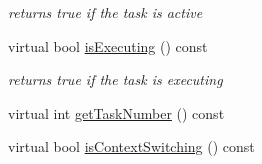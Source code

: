 \begin{DoxyCompactItemize}
\begin{DoxyCompactList}\small\item\em returns true if the task is active \end{DoxyCompactList}\item 
virtual bool \hyperlink{classRTSim_1_1Server_a11751271822265359e00ebc4b6ea625b}{is\+Executing} () const \hypertarget{classRTSim_1_1Server_a11751271822265359e00ebc4b6ea625b}{}\label{classRTSim_1_1Server_a11751271822265359e00ebc4b6ea625b}

\begin{DoxyCompactList}\small\item\em returns true if the task is executing \end{DoxyCompactList}\item 
virtual int \hyperlink{classRTSim_1_1Server_a51dbd3d4e2e522f8a045ba120bd1fb46}{get\+Task\+Number} () const 
\item 
virtual bool \hyperlink{classRTSim_1_1Server_afcacde6ebafc96c299ad19310a44f691}{is\+Context\+Switching} () const 
\end{DoxyCompactItemize}
